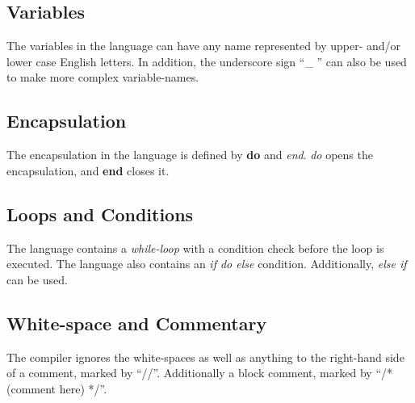 \subsection{Variables}
The variables in the language can have any name represented by upper- and/or lower case English letters. In addition, the underscore sign ``\_ '' can also be used to make more complex variable-names. 

\subsection{Encapsulation}
The encapsulation in the language is defined by \textbf{do} and \textit{end}. \textit{do} opens the encapsulation, and \textbf{end} closes it.   

\subsection{Loops and Conditions}
The language contains a \textit{while-loop} with a condition check before the loop is executed. The language also contains an \textit{if do else} condition. Additionally, \textit{else if} can be used.   

\subsection{White-space and Commentary}
The compiler ignores the white-spaces as well as anything to the right-hand side of a comment, marked by ``//''. Additionally a block comment, marked by ``/* (comment here) */''.


